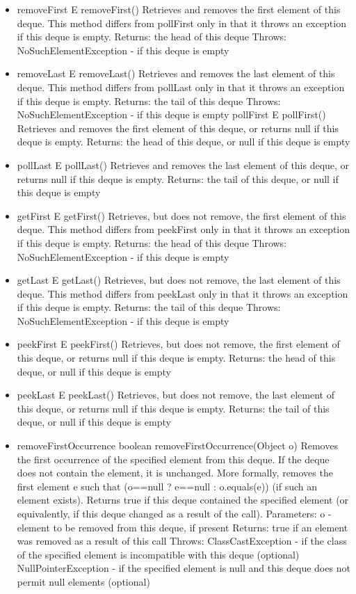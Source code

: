 \documentclass{book}
\begin{document}
\begin{itemize}
	\item removeFirst
	E removeFirst()
	Retrieves and removes the first element of this deque. This method differs from pollFirst only in that it throws an exception if this deque is empty.
	Returns:
	the head of this deque
	Throws:
	NoSuchElementException - if this deque is empty
	
	\item removeLast
	E removeLast()
	Retrieves and removes the last element of this deque. This method differs from pollLast only in that it throws an exception if this deque is empty.
	Returns:
	the tail of this deque
	Throws:
	NoSuchElementException - if this deque is empty
	pollFirst
	E pollFirst()
	Retrieves and removes the first element of this deque, or returns null if this deque is empty.
	Returns:
	the head of this deque, or null if this deque is empty
	
	\item pollLast
	E pollLast()
	Retrieves and removes the last element of this deque, or returns null if this deque is empty.
	Returns:
	the tail of this deque, or null if this deque is empty
	
	\item getFirst
	E getFirst()
	Retrieves, but does not remove, the first element of this deque. This method differs from peekFirst only in that it throws an exception if this deque is empty.
	Returns:
	the head of this deque
	Throws:
	NoSuchElementException - if this deque is empty
	
	\item getLast
	E getLast()
	Retrieves, but does not remove, the last element of this deque. This method differs from peekLast only in that it throws an exception if this deque is empty.
	Returns:
	the tail of this deque
	Throws:
	NoSuchElementException - if this deque is empty
	
	\item peekFirst
	E peekFirst()
	Retrieves, but does not remove, the first element of this deque, or returns null if this deque is empty.
	Returns:
	the head of this deque, or null if this deque is empty
	
	\item peekLast
	E peekLast()
	Retrieves, but does not remove, the last element of this deque, or returns null if this deque is empty.
	Returns:
	the tail of this deque, or null if this deque is empty
	
	\item removeFirstOccurrence
	boolean removeFirstOccurrence(Object o)
	Removes the first occurrence of the specified element from this deque. If the deque does not contain the element, it is unchanged. More formally, removes the first element e such that (o==null ? e==null : o.equals(e)) (if such an element exists). Returns true if this deque contained the specified element (or equivalently, if this deque changed as a result of the call).
	Parameters:
	o - element to be removed from this deque, if present
	Returns:
	true if an element was removed as a result of this call
	Throws:
	ClassCastException - if the class of the specified element is incompatible with this deque (optional)
	NullPointerException - if the specified element is null and this deque does not permit null elements (optional)
	

\end{itemize}
\end{document}
